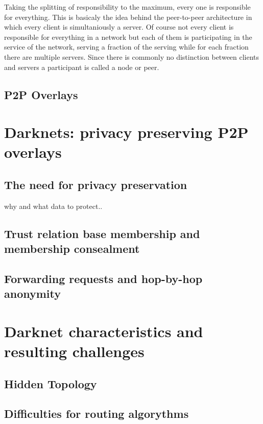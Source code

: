 Taking the splitting of responsibility to the maximum, every one is responsible for everything. This is basicaly the idea behind the peer-to-peer architecture in which every client is simultaniously a server. Of course not every client is responsible for everything in a network but each of them is participating in the service of the network, serving a fraction of the serving while for each fraction there are multiple servers. Since there is commonly no distinction between clients and servers a participant is called a node or peer.

\subsection{P2P Overlays}



\section{Darknets: privacy preserving P2P overlays}

\subsection{The need for privacy preservation}
why and what data to protect..

\subsection{Trust relation base membership and membership consealment}

\subsection{Forwarding requests and hop-by-hop anonymity}


\section{Darknet characteristics and resulting challenges}

\subsection{Hidden Topology}

\subsection{Difficulties for routing algorythms}

